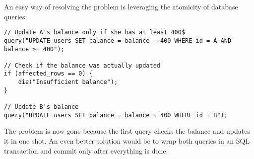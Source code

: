 An easy way of resolving the problem is leveraging the atomicity of database queries:

\begin{verbatim}
// Update A's balance only if she has at least 400$
query("UPDATE users SET balance = balance - 400 WHERE id = A AND balance >= 400");

// Check if the balance was actually updated
if (affected_rows == 0) {
    die("Insufficient balance");
}

// Update B's balance
query("UPDATE users SET balance = balance + 400 WHERE id = B");
\end{verbatim}

\noindent
The problem is now gone because the first query checks the balance and updates it in one shot. An even better solution would be to wrap both queries in an SQL transaction and commit only after everything is done.
